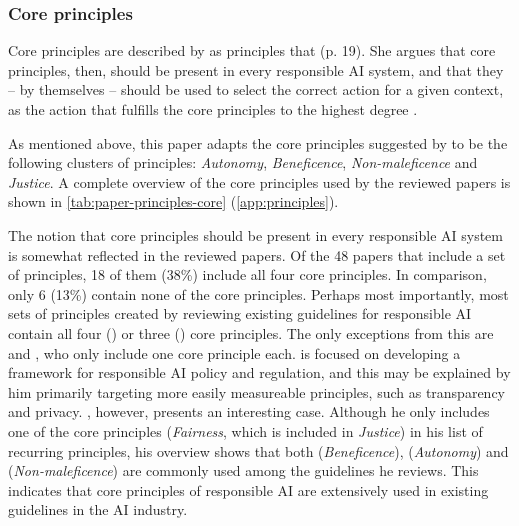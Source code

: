 \subsubsection{Core principles}
Core principles are described by \textcite{Canca_2020} as principles that  (p. 19). She argues that core principles, then, should be present in every responsible AI system, and that they -- by themselves -- should be used to select the correct action for a given context, as the action that fulfills the core principles to the highest degree \parencite{Canca_2020}.

As mentioned above, this paper adapts the core principles suggested by \textcite{Canca_2020} to be the following clusters of principles: \textit{Autonomy}, \textit{Beneficence}, \textit{Non-maleficence} and \textit{Justice}. A complete overview of the core principles used by the reviewed papers is shown in \autoref{tab:paper-principles-core} (\autoref{app:principles}).

The notion that core principles should be present in every responsible AI system is somewhat reflected in the reviewed papers. Of the 48 papers that include a set of principles, 18 of them (38\%) include all four core principles. In comparison, only 6 (13\%) contain none of the core principles. Perhaps most importantly, most sets of principles created by reviewing existing guidelines for responsible AI contain all four (\cite{Clarke_2019,Floridi_2018,Jobin_2019,Ryan_2021}) or three (\cite{Fjeld_2020}) core principles. The only exceptions from this are \textcite{Brand_2022} and \textcite{Hagendorff_2020}, who only include one core principle each. \textcite{Brand_2022} is focused on developing a framework for responsible AI policy and regulation, and this may be explained by him primarily targeting more easily measureable principles, such as transparency and privacy. \textcite{Hagendorff_2020}, however, presents an interesting case. Although he only includes one of the core principles (\textit{Fairness}, which is included in \textit{Justice}) in his list of recurring principles, his overview \parencite[Table 1]{Hagendorff_2020} shows that both  (\textit{Beneficence}),  (\textit{Autonomy}) and  (\textit{Non-maleficence}) are commonly used among the guidelines he reviews. This indicates that core principles of responsible AI are extensively used in existing guidelines in the AI industry. 

